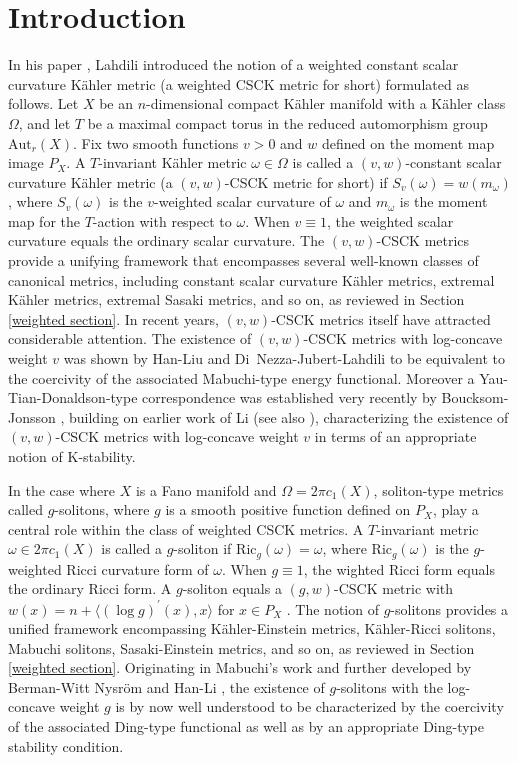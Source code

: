 \documentclass[12pt]{amsart}
\numberwithin{equation}{section}%
\theoremstyle{plain}
\theoremstyle{definition}
\newcommand{\Ric}{\mathrm{Ric}}
\newcommand{\1}{\mathbf{1}}
\begin{document}
\section{Introduction}
In his paper \cite{Lah19}, Lahdili
introduced the notion of a weighted
constant scalar curvature K\"ahler metric (a weighted  CSCK metric for short)
formulated as follows.
Let $X$ be an $n$-dimensional compact K\"ahler manifold with a
K\"ahler class $\Omega$, and 
let $T$ be a maximal compact torus in
the reduced automorphism group $\mathrm{Aut}_{r}(X)$.
Fix two smooth functions $v>0$ and $w$ defined on
the moment map image $P_{X}$.
A $T$-invariant K\"ahler metric $\omega\in\Omega$ is called
 a $(v,w)$-constant scalar curvature K\"ahler metric
(a $(v,w)$-CSCK metric for short) if $S_{v}(\omega)=w(m_{\omega})$,
where $S_{v}(\omega)$ is the $v$-weighted scalar curvature of $\omega$ and 
$m_{\omega}$ is the moment map for the $T$-action
with respect to $\omega$.
When $v\equiv 1$, the weighted scalar curvature equals the ordinary scalar curvature.
The $(v,w)$-CSCK metrics provide a unifying framework that encompasses several
well-known classes of canonical metrics,
including
constant scalar curvature K\"ahler metrics, extremal K\"ahler metrics, 
extremal Sasaki metrics, and so on,
as reviewed in Section \ref{weighted section}.
In recent years, $(v,w)$-CSCK metrics itself have attracted considerable attention. 
The existence of $(v,w)$-CSCK metrics with log-concave weight $v$
was shown by Han-Liu \cite{HanLiu25} and Di~Nezza-Jubert-Lahdili \cite{DJL24, DJL25}
to be equivalent to the coercivity of the associated Mabuchi-type energy functional. 
Moreover a Yau-Tian-Donaldson-type correspondence was established
very recently by Boucksom-Jonsson \cite{BJ25},
building on earlier work of Li \cite{CL22}
(see also \cite{HanLiu25b, Ha25}),
characterizing the existence of $(v,w)$-CSCK metrics with log-concave weight $v$
in terms of an appropriate notion of K-stability.

In the case where $X$ is a Fano manifold and $\Omega=2\pi c_{1}(X)$,
soliton-type metrics called $g$-solitons,
where $g$ is a smooth positive function defined on $P_{X}$,
play a central role within the class of weighted CSCK metrics.
A $T$-invariant metric $\omega\in 2\pi c_{1}(X)$ is called a $g$-soliton
if $\Ric_{g}(\omega)=\omega$, where $\Ric_{g}(\omega)$ is the $g$-weighted
Ricci curvature form of $\omega$.
When $g\equiv 1$, the wighted Ricci form equals the ordinary Ricci form.
A $g$-soliton equals a $(g,w)$-CSCK metric with
$w(x)=n+\langle (\log g)^{\prime}(x),x\rangle$ for $x\in P_{X}$ \cite{AJL23}.
The notion of $g$-solitons provides a unified framework encompassing
K\"ahler-Einstein metrics, K\"ahler-Ricci solitons, Mabuchi solitons, Sasaki-Einstein metrics,
and so on, as reviewed in Section \ref{weighted section}.
Originating in Mabuchi's work \cite{Ma03} and further developed 
by Berman-Witt Nysr\"om \cite{BW14} and Han-Li \cite{HaLi20},
the existence of $g$-solitons with the log-concave weight $g$
is by now well understood to be characterized by
the coercivity of the associated Ding-type functional
as well as by an appropriate Ding-type stability condition.
\end{document}
